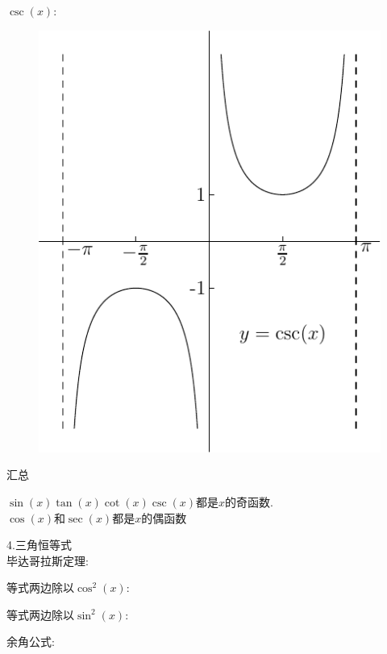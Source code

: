 $\csc(x)$:
\begin{figure}[H]
\centering
\includegraphics{csc.pdf}
\end{figure}
汇总
\begin{center}
\begin{boxedminipage}{8cm}
	$\sin(x)$\caesura$\tan(x)$\caesura$\cot(x)$\caesura$\csc(x)$都是$x$的奇函数.\\
	$\cos(x)$和$\sec(x)$都是$x$的偶函数
\end{boxedminipage}
\end{center}\vspace{8ex}

4.三角恒等式\\
毕达哥拉斯定理:
{\par\centering
{}
\par}

等式两边除以$\cos^2(x)$:
{\par\centering
{}
\par}

等式两边除以$\sin^2(x)$:
{\par\centering
{}
\par}

余角公式:
{\par\centering
    \\[2ex]
\par}

